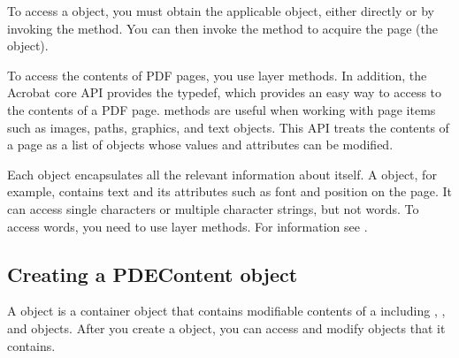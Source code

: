 \documentclass[letterpaper,12pt,english,openany,oneside]{sphinxmanual}
\begin{document}
To access a  object, you must obtain the applicable  object, either directly or by invoking the  method. You can then invoke the  method to acquire the page (the  object).

To access the contents of PDF pages, you use  layer methods. In addition, the Acrobat core API provides the  typedef, which provides an easy way to access to the contents of a PDF page.  methods are useful when working with page items such as images, paths, graphics, and text objects. This API treats the contents of a page as a list of objects whose values and attributes can be modified.

Each  object encapsulates all the relevant information about itself. A  object, for example, contains text and its attributes such as font and position on the page. It can access single characters or multiple character strings, but not words. To access words, you need to use  layer methods. For information see .


\subsection{Creating a PDEContent object}
\label{\detokenize{Plugins_Pages:creating-a-pdecontent-object}}
A  object is a container object that contains modifiable contents of a  including , , and  objects. After you create a  object, you can access and modify objects that it contains.
\end{document}
